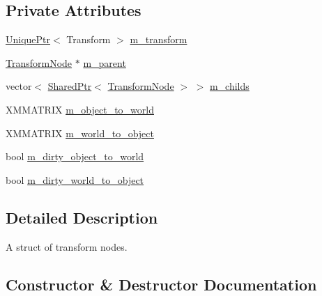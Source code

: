 \subsection*{Private Attributes}
\begin{DoxyCompactItemize}
\item 
\hyperlink{namespacemage_a8c307fbcc33bce9b7f2aa4c26c3b95cf}{Unique\+Ptr}$<$ Transform $>$ \hyperlink{classmage_1_1_transform_node_ac601e39377f706442da334e040adaab3}{m\+\_\+transform}
\item 
\hyperlink{classmage_1_1_transform_node}{Transform\+Node} $\ast$ \hyperlink{classmage_1_1_transform_node_a8bb7cfa7292d63f96eedb09b313e1ddb}{m\+\_\+parent}
\item 
vector$<$ \hyperlink{namespacemage_a1e01ae66713838a7a67d30e44c67703e}{Shared\+Ptr}$<$ \hyperlink{classmage_1_1_transform_node}{Transform\+Node} $>$ $>$ \hyperlink{classmage_1_1_transform_node_a195ffa4b40a7055bad41c1fec83e0dc0}{m\+\_\+childs}
\item 
X\+M\+M\+A\+T\+R\+IX \hyperlink{classmage_1_1_transform_node_a79de447d6d40226d7ceb276007f5fbeb}{m\+\_\+object\+\_\+to\+\_\+world}
\item 
X\+M\+M\+A\+T\+R\+IX \hyperlink{classmage_1_1_transform_node_ade413fc9a980ce8e1191c17f94f25e3f}{m\+\_\+world\+\_\+to\+\_\+object}
\item 
bool \hyperlink{classmage_1_1_transform_node_a389151fddc72499d0be4e725622d99b9}{m\+\_\+dirty\+\_\+object\+\_\+to\+\_\+world}
\item 
bool \hyperlink{classmage_1_1_transform_node_acb9046e0096ada337e1978f016daa144}{m\+\_\+dirty\+\_\+world\+\_\+to\+\_\+object}
\end{DoxyCompactItemize}


\subsection{Detailed Description}
A struct of transform nodes. 

\subsection{Constructor \& Destructor Documentation}
\hypertarget{classmage_1_1_transform_node_aec41a87ef5f7bca905e1de4b8959350a}{}\label{classmage_1_1_transform_node_aec41a87ef5f7bca905e1de4b8959350a} 

